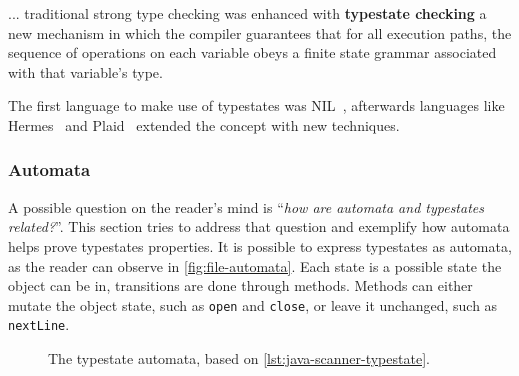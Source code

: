 \begin{displayquote}
    ... traditional strong type checking was enhanced with \textbf{typestate checking}
    a new mechanism in which the compiler guarantees that for all execution paths,
    the sequence of operations on each variable obeys a finite state grammar associated with that variable's type.
\end{displayquote}

The first language to make use of typestates was NIL~\autocite{Strom1983},
afterwards languages like Hermes~\autocite{Strom1990} and Plaid~\autocite{Aldrich2009}
extended the concept with new techniques.

\subsubsection*{Automata}

A possible question on the reader's mind is “\emph{how are automata and typestates related?}”.
This section tries to address that question and exemplify how automata helps prove typestates properties.
It is possible to express typestates as automata, as the reader can observe in \autoref{fig:file-automata}.
Each state is a possible state the object can be in, transitions are done through methods.
Methods can either mutate the object state, such as \texttt{open} and \texttt{close},
or leave it unchanged, such as \texttt{nextLine}.

\begin{figure}
    \centering
    \caption{The  typestate automata, based on \autoref{lst:java-scanner-typestate}.}
    \label{fig:file-automata}
\end{figure}

